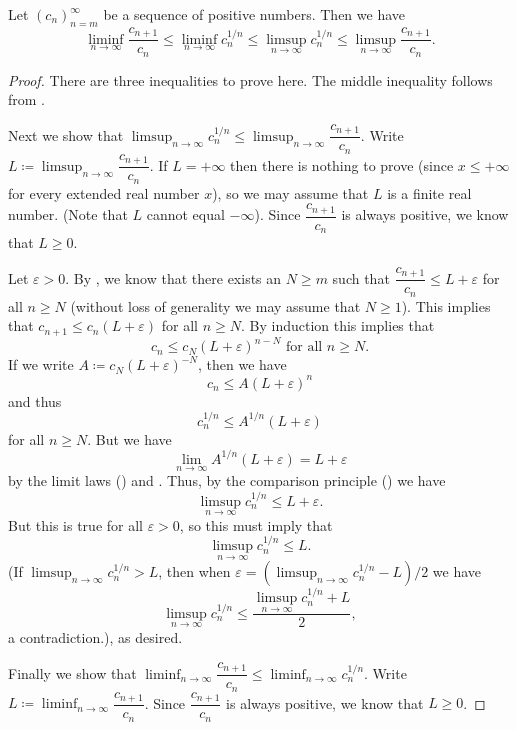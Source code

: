 \begin{lem}\label{i:7.5.2}
  Let \((c_n)_{n = m}^\infty\) be a sequence of positive numbers.
  Then we have
  \[
    \liminf_{n \to \infty} \dfrac{c_{n + 1}}{c_n} \leq \liminf_{n \to \infty} c_n^{1 / n} \leq \limsup_{n \to \infty} c_n^{1 / n} \leq \limsup_{n \to \infty} \dfrac{c_{n + 1}}{c_n}.
  \]
\end{lem}

\begin{proof}
  There are three inequalities to prove here.
  The middle inequality follows from .

  Next we show that \(\limsup_{n \to \infty} c_n^{1 / n} \leq \limsup_{n \to \infty} \dfrac{c_{n + 1}}{c_n}\).
  Write \(L \coloneqq \limsup_{n \to \infty} \dfrac{c_{n + 1}}{c_n}\).
  If \(L = +\infty\) then there is nothing to prove (since \(x \leq +\infty\) for every extended real number \(x\)), so we may assume that \(L\) is a finite real number.
  (Note that \(L\) cannot equal \(-\infty\)).
  Since \(\dfrac{c_{n + 1}}{c_n}\) is always positive, we know that \(L \geq 0\).

  Let \(\varepsilon > 0\).
  By , we know that there exists an \(N \geq m\) such that \(\dfrac{c_{n + 1}}{c_n} \leq L + \varepsilon\) for all \(n \geq N\)
  (without loss of generality we may assume that \(N \geq 1\)).
  This implies that \(c_{n + 1} \leq c_n (L + \varepsilon)\) for all \(n \geq N\).
  By induction this implies that
  \[
    c_n \leq c_N (L + \varepsilon)^{n - N} \text{ for all } n \geq N.
  \]
  If we write \(A \coloneqq c_N (L + \varepsilon)^{-N}\), then we have
  \[
    c_n \leq A(L + \varepsilon)^n
  \]
  and thus
  \[
    c_n^{1 / n} \leq A^{1 / n} (L + \varepsilon)
  \]
  for all \(n \geq N\).
  But we have
  \[
    \lim_{n \to \infty} A^{1 / n} (L + \varepsilon) = L + \varepsilon
  \]
  by the limit laws () and .
  Thus, by the comparison principle () we have
  \[
    \limsup_{n \to \infty} c_n^{1 / n} \leq L + \varepsilon.
  \]
  But this is true for all \(\varepsilon > 0\), so this must imply that
  \[
    \limsup_{n \to \infty} c_n^{1 / n} \leq L.
  \]
  (If \(\limsup_{n \to \infty} c_n^{1 / n} > L\), then when \(\varepsilon = (\limsup_{n \to \infty} c_n^{1 / n} - L) / 2\) we have
  \[
    \limsup_{n \to \infty} c_n^{1 / n} \leq \dfrac{\limsup_{n \to \infty} c_n^{1 / n} + L}{2},
  \]
  a contradiction.), as desired.

  Finally we show that \(\liminf_{n \to \infty} \dfrac{c_{n + 1}}{c_n} \leq \liminf_{n \to \infty} c_n^{1 / n}\).
  Write \(L \coloneqq \liminf_{n \to \infty} \dfrac{c_{n + 1}}{c_n}\).
  Since \(\dfrac{c_{n + 1}}{c_n}\) is always positive, we know that \(L \geq 0\).


\end{proof}
